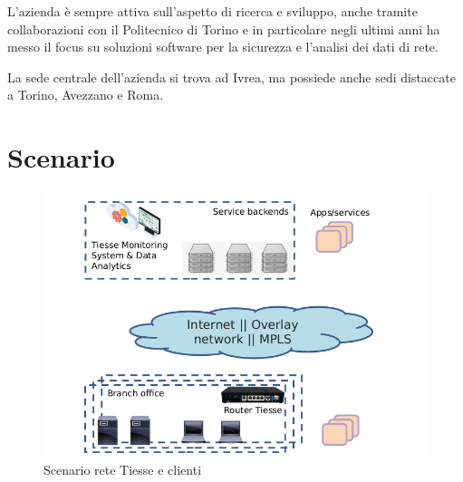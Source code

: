 L'azienda è sempre attiva sull'aspetto di ricerca e sviluppo, anche tramite collaborazioni con il Politecnico di Torino e in particolare negli ultimi anni ha messo il focus su soluzioni software per la sicurezza e l'analisi dei dati di rete.

La sede centrale dell'azienda si trova ad Ivrea, ma possiede anche sedi distaccate a Torino, Avezzano e Roma.



\section{Scenario}
\begin{figure}[]
    \label{fig:scenario}
    \includegraphics[width=\hsize]{images/introduzione/scenario_2.png}
    \caption{Scenario rete Tiesse e clienti}
    \centering
\end{figure}

